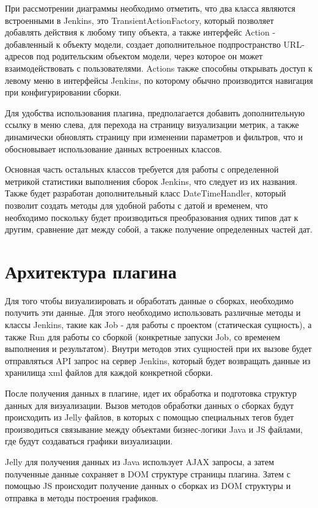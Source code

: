 При рассмотрении диаграммы необходимо отметить, что два класса являются встроенными в Jenkins, это TransientActionFactory, который позволяет добавлять действия к любому типу объекта, а также интерфейс Action - добавленный к объекту модели, создает дополнительное подпространство URL-адресов под родительским объектом модели, через которое он может взаимодействовать с пользователями. Actions также способны открывать доступ к левому меню в интерфейсы Jenkins, по которому обычно производится навигация при конфигурировании сборки.

Для удобства использования плагина, предполагается добавить дополнительную ссылку в меню слева, для перехода на страницу визуализации метрик, а также динамически обновлять страницу при изменении параметров и фильтров, что и обосновывает использование данных встроенных классов.

Основная часть остальных классов требуется для работы с определенной метрикой статистики выполнения сборок Jenkins, что следует из их названия. Также будет разработан дополнительный класс DateTimeHandler, который позволит создать методы для удобной работы с датой и временем, что необходимо поскольку будет производиться преобразования одних типов дат к другим, сравнение дат между собой, а также получение определенных частей дат.

\section{Архитектура плагина} \label{ch1:sec3}

Для того чтобы визуализировать и обработать данные о сборках, необходимо получить эти данные. Для этого необходимо использовать различные методы и классы Jenkins, такие как Job - для работы с проектом (статическая сущность), а также Run для работы со сборкой (конкретные запуски Job, со временем выполнения и результатом). Внутри методов этих сущностей при их вызове будет отправляться API запрос на сервер Jenkins, который будет возвращать данные из хранилища xml файлов для каждой конкретной сборки.

После получения данных в плагине, идет их обработка и подготовка структур данных для визуализации. Вызов методов обработки данных о сборках будут происходить из Jelly файлов, в которых с помощью специальных тегов будет производиться связывание между объектами бизнес-логики Java и JS файлами, где будут создаваться графики визуализации.

Jelly для получения данных из Java использует AJAX запросы, а затем полученные данные сохраняет в DOM структуре страницы плагина. Затем с помощью JS происходит получение данных о сборках из DOM структуры и отправка в методы построения графиков.

